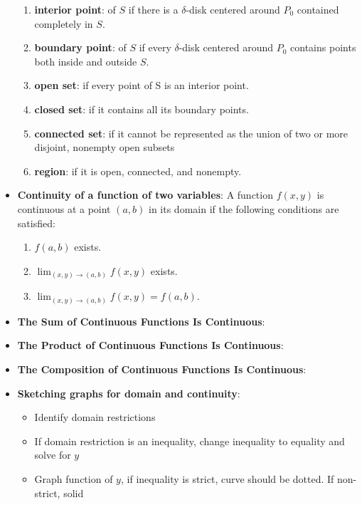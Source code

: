 \documentclass{report}
\begin{document}
\begin{itemize}
\begin{enumerate}[label=(\alph*)]
                    \item \textbf{interior point}: of $S$ if there is a $\delta$-disk centered around $P_0$ contained completely in $S$.
                    \item \textbf{boundary point}: of $S$ if every $\delta$-disk centered around $P_0$ contains points both inside and outside $S$.
                    \item \textbf{open set}: if every point of S is an interior point. 
                    \item \textbf{closed set}: if it contains all its boundary points.
                    \item \textbf{connected set}: if it cannot be represented as the union of two or more disjoint, nonempty open subsets 
                    \item \textbf{region}: if it is open, connected, and nonempty.
                \end{enumerate}
                \bigbreak \noindent 
            \item \textbf{Continuity of a function of two variables}:
                A function $f(x,y)$ is continuous at a point $(a,b)$ in its domain if the following conditions are satisfied:
                \begin{enumerate}
                    \item $f(a,b)$ exists.
                    \item $\lim_{(x,y) \to (a,b)} f(x,y)$ exists.
                    \item $\lim_{(x,y) \to (a,b)} f(x,y) = f(a,b)$.
                \end{enumerate}
            \item \textbf{The Sum of Continuous Functions Is Continuous}:
            \item \textbf{The Product of Continuous Functions Is Continuous}:
            \item \textbf{The Composition of Continuous Functions Is Continuous}:
            \item \textbf{Sketching graphs for domain and continuity}:
                \begin{itemize}
                    \item Identify domain restrictions
                    \item If domain restriction is an inequality, change inequality to equality and solve for $y$
                    \item Graph function of $y$, if inequality is strict, curve should be dotted. If non-strict, solid

\end{itemize}
\end{itemize}
\end{document}
